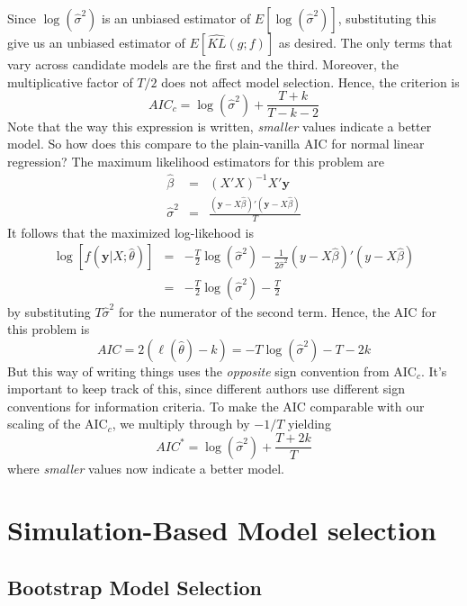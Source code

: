 \documentclass[12pt]{article}
\theoremstyle{definition}
\begin{document}
Since $\log(\widehat{\sigma}^2)$ is an unbiased estimator of $E[\log(\widehat{\sigma}^2)]$, substituting this give us an unbiased estimator of $E\left[\widehat{KL}(g;f) \right]$ as desired.
The only terms that vary across candidate models are the first and the third. Moreover, the multiplicative factor of $T/2$ does not affect model selection. Hence, the criterion is
$$AIC_c = \log(\widehat{\sigma}^2) + \frac{T + k}{T - k -2}$$
Note that the way this expression is written, \emph{smaller} values indicate a better model. So how does this compare to the plain-vanilla AIC for normal linear regression? The maximum likelihood estimators for this problem are
\begin{eqnarray*}
\widehat{\beta} &=& (X'X)^{-1}X'\mathbf{y}\\
\widehat{\sigma}^2 &=& \frac{(\mathbf{y} - X\widehat{\beta})'(\mathbf{y} - X\widehat{\beta})}{T}
\end{eqnarray*}
It follows that the maximized log-likehood is
\begin{eqnarray*}
\log\left[f(\mathbf{y}|X;\widehat{\theta})\right] &=& -\frac{T}{2} \log(\widehat{\sigma}^2) - \frac{1}{2\widehat{\sigma}^2}(y - X\widehat{\beta})'(y -X\widehat{\beta})\\
&=& -\frac{T}{2} \log(\widehat{\sigma}^2) - \frac{T}{2}
\end{eqnarray*}
by substituting $T\widehat{\sigma}^2$ for the numerator of the second term. Hence, the AIC for this problem is
$$AIC = 2\left(\ell(\widehat{\theta}) - k \right) = -T\log(\widehat{\sigma}^2) - T - 2k $$
But this way of writing things uses the \emph{opposite} sign convention from AIC$_c$. It's important to keep track of this, since different authors use different sign conventions for information criteria. To make the AIC comparable with our scaling of the AIC$_c$, we multiply through by $-1/T$ yielding
$$AIC^* = \log(\widehat{\sigma}^2) + \frac{T + 2k}{T}$$
where \emph{smaller} values now indicate a better model.


\section{Simulation-Based Model selection}

\subsection{Bootstrap Model Selection}
\end{document}
